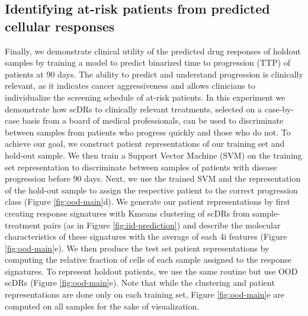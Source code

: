 \subsection{Identifying at-risk patients from predicted cellular responses}
Finally, we demonstrate clinical utility of the predicted drug responses of holdout samples by training a model to predict binarized time to progression (TTP) of patients at 90 days.
The ability to predict and understand progression is clinically relevant, as it indicates cancer aggressiveness \cite{porreca2024} and allows clinicians to individualize the screening schedule of at-risk patients.
In this experiment we demonstrate how scDRs to clinically relevant treatments, selected on a case-by-case basis from a board of medical professionals, can be used to discriminate between samples from patients who progress quickly and those who do not.
To achieve our goal, we construct patient representations of our training set and hold-out sample.
 We then train a Support Vector Machine (SVM) on the training set representation to discriminate between samples of patients with disease progression before 90 days.
 Next, we use the trained SVM and the representation of the hold-out sample to assign the respective patient to the correct progression class (Figure \ref{fig:ood-main}d).
 We generate our patient representations by first creating response signatures with Kmeans clustering of scDRs from sample-treatment pairs (as in Figure \ref{fig:iid-prediction}) and describe the molecular characteristics of these signatures with the average of each 4i features (Figure \ref{fig:ood-main}e).
 We then produce the test set patient representations by computing the relative fraction of cells of each sample assigned to the response signatures. To represent holdout patients, we use the same routine but use OOD scDRs (Figure \ref{fig:ood-main}e).
 Note that while the clustering and patient representations are done only on each training set, Figure \ref{fig:ood-main}e are computed on all samples for the sake of visualization.
 
